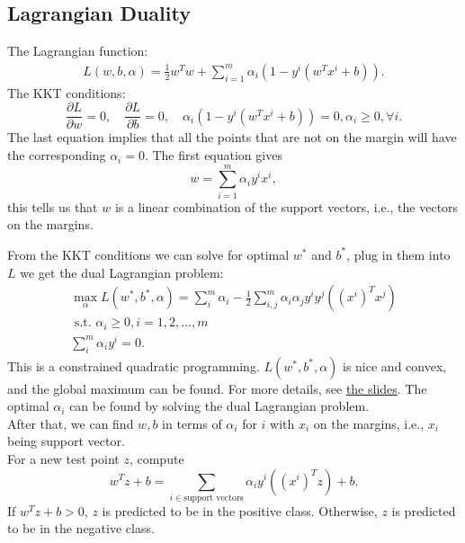 \documentclass[twoside,12pt]{article}
\begin{document}
\subsection{Lagrangian Duality}
The Lagrangian function:
\begin{align}\label{eq3}
L(w,b,\alpha) = \frac 1 2 w^Tw + \sum_{i=1}^m \alpha_i(1-y^i(w^Tx^i + b)).
\end{align}
The KKT conditions:
$$\frac{\partial L}{\partial w} = 0, \quad \frac{\partial L}{\partial b} = 0, \quad \alpha_i(1-y^i(w^Tx^i + b)) = 0, \alpha_i \geq 0,  \forall i.$$
The last equation implies that all the points that are not on the margin will have the corresponding $\alpha_i = 0$. The first equation gives $$w = \sum_{i=1}^m \alpha_i y^i x^i,$$ this tells us that $w$ is a linear combination of the support vectors, i.e., the vectors on the margins. 

From the KKT conditions we can solve for optimal $w^*$ and $b^*$, plug in them into $L$ we get the dual Lagrangian problem:
\begin{align}\label{eq4}
\max_{\alpha} L(w^*, b^*, \alpha) = \sum_{i}^m \alpha_i - \frac 1 2 \sum_{i,j}^m \alpha_i \alpha_j y^i y^j ((x^i)^Tx^j)\\
\text{ s.t. } \alpha_i \geq 0, i = 1, 2, ..., m\\
\sum_i^m \alpha_i y^i = 0. 
\end{align}
This is a constrained quadratic programming. $L(w^*, b^*, \alpha)$ is nice and convex, and the global maximum can be found. For more details, see \href{https://github.com/sliao7/CSE6740_Computational_Data_Analysis/blob/main/slides/svm.pdf}{the slides}. The optimal $\alpha_i$ can be found by solving the dual Lagrangian problem. \\

After that, we can find $w, b$ in terms of $\alpha_i$ for $i$ with $x_i$ on the margins, i.e., $x_i$ being support vector. \\

For a new test point $z$, compute $$w^Tz + b = \sum_{i \in \text{support vectors}} \alpha_i y^i((x^i)^Tz) + b.$$
If $w^Tz + b > 0$, $z$ is predicted to be in the positive class. Otherwise, $z$ is predicted to be in the negative class.
\end{document}
